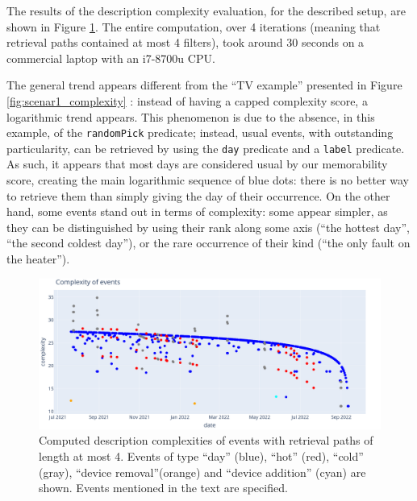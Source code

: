 \documentclass[entropy,article,submit,moreauthors,pdftex]{Definitions/mdpi}
\begin{document}
The results of the description complexity evaluation, for the described setup,
are shown in Figure \ref{fig:computed_cplx}. The entire computation, over 4
iterations (meaning that retrieval paths contained at most 4 filters), took
around 30 seconds on a commercial laptop with an i7-8700u CPU.

The general trend appears different from the ``TV example'' presented in Figure \ref{fig:scenar1_complexity} : instead of having a capped complexity score, a logarithmic trend appears. This phenomenon is due to the absence, in this example, of the \texttt{randomPick} predicate; instead, usual events, with outstanding particularity, can be retrieved by using the \texttt{day} predicate and a \texttt{label} predicate. As such, it appears that most days are considered usual by our memorability score, creating the main logarithmic sequence of blue dots: there is no better way to retrieve them than simply giving the day of their occurrence. On the other hand, some events stand out in terms of
complexity: some appear simpler, as they can be distinguished by using their
rank along some axis (``the hottest day'', ``the second coldest day''), or the rare occurrence of their kind (``the only fault on the heater'').

\begin{figure}[ht]
    \centering
    \includegraphics[width=.9\linewidth]{figures/complexity_scenar_2.png}
    \caption{Computed description complexities of events with retrieval paths of
        length at most 4. Events of type ``day'' (blue), ``hot'' (red), ``cold''
        (gray), ``device removal''(orange) and ``device addition'' (cyan) are shown. Events mentioned in the text are specified.}
    \label{fig:computed_cplx}
\end{figure}
\end{document}
